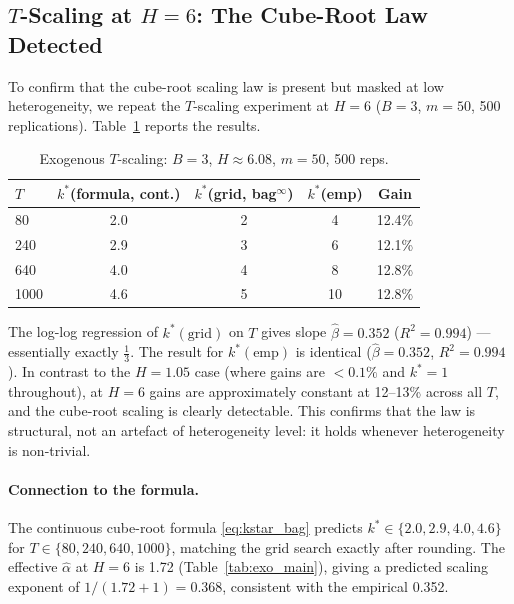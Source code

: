 \documentclass[12pt,a4paper]{article}
\begin{document}
\subsection{$T$-Scaling at $H=6$: The Cube-Root Law Detected}
\label{sec:h6scaling}

To confirm that the cube-root scaling law is present but masked at low
heterogeneity, we repeat the $T$-scaling experiment at $H=6$ ($B=3$,
$m=50$, 500 replications). Table~\ref{tab:exo_scaling_h6} reports
the results.

\begin{table}[h]
\centering
\caption{Exogenous $T$-scaling: $B=3$, $H\approx6.08$, $m=50$, 500 reps.}
\label{tab:exo_scaling_h6}
\begin{tabular}{lcccc}
\toprule
$T$ & $k^*$(formula, cont.) & $k^*$(grid, bag$^\infty$) & $k^*$(emp) & Gain \\
\midrule
80   & 2.0 & 2 & 4  & 12.4\% \\
240  & 2.9 & 3 & 6  & 12.1\% \\
640  & 4.0 & 4 & 8  & 12.8\% \\
1000 & 4.6 & 5 & 10 & 12.8\% \\
\bottomrule
\end{tabular}
\end{table}

\noindent
The log-log regression of $k^*(\text{grid})$ on $T$ gives slope
$\hat\beta = 0.352$ ($R^2 = 0.994$) --- essentially exactly $\tfrac{1}{3}$.
The result for $k^*(\text{emp})$ is identical ($\hat\beta = 0.352$,
$R^2 = 0.994$). In contrast to the $H=1.05$ case (where gains are
$<0.1\%$ and $k^*=1$ throughout), at $H=6$ gains are approximately
constant at 12--13\% across all $T$, and the cube-root scaling is clearly
detectable. This confirms that the law is structural, not an artefact of
heterogeneity level: it holds whenever heterogeneity is non-trivial.

\paragraph{Connection to the formula.}
The continuous cube-root formula \eqref{eq:kstar_bag} predicts
$k^* \in \{2.0, 2.9, 4.0, 4.6\}$ for $T \in \{80, 240, 640, 1000\}$,
matching the grid search exactly after rounding. The effective $\hat\alpha$
at $H=6$ is 1.72 (Table~\ref{tab:exo_main}), giving a predicted scaling
exponent of $1/(1.72+1) = 0.368$, consistent with the empirical 0.352.

\end{document}
